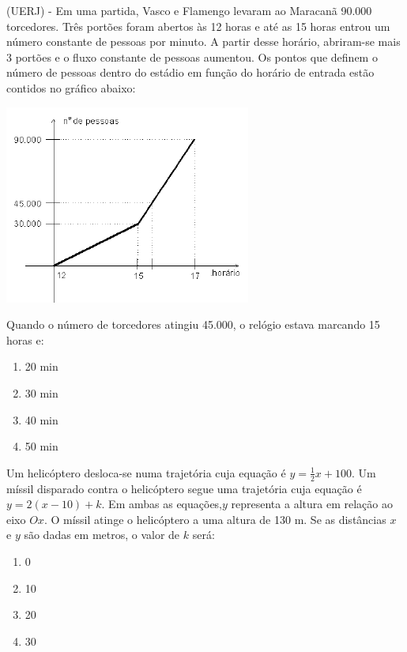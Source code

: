 				\item (UERJ) - Em uma partida, Vasco e Flamengo levaram ao Maracanã 90.000 torcedores. Três portões foram abertos às 12 horas e até as 15 horas entrou um número constante de pessoas por minuto. \newline A partir desse horário, abriram-se mais 3 portões e o fluxo constante
de pessoas aumentou. Os pontos que definem o número de pessoas dentro do estádio em função do horário de entrada estão contidos no gráfico abaixo:
				\begin{center}
				\includegraphics[scale=0.8]{figuras/fig15}
				\end{center}
				Quando o número de torcedores atingiu 45.000, o relógio estava marcando 15 horas e:
				\begin{multicols}{4}
				\begin{enumerate}
					\item 20 min
					\item 30 min
					\item 40 min
					\item 50 min 					 
				\end{enumerate}
				\end{multicols}
				
				\item Um helicóptero desloca-se numa trajetória cuja equação é $y=\displaystyle\frac{1}{2}x+100$. Um míssil disparado contra o helicóptero segue uma trajetória cuja
equação é $y = 2(x -10) + k$. Em ambas as equações,$y$ representa a altura em relação ao eixo $Ox$. O míssil atinge o helicóptero a uma altura de 130 m. Se as distâncias $x$ e $y$ são dadas em metros, o valor de $k$ será:
				\begin{multicols}{4}
				\begin{enumerate}
					\item 0
					\item 10
					\item 20
					\item 30 					 
				\end{enumerate}
				\end{multicols}


				

